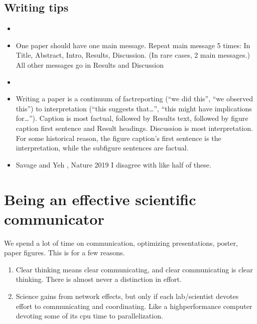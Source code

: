 \documentclass[letterpaper,10pt,english]{sphinxmanual}
\begin{document}
\subsection{Writing tips}
\label{\detokenize{PaperWritingTips:writing-tips}}\begin{itemize}
\item {} 
\sphinxAtStartPar
{}

\item {} 
\sphinxAtStartPar
One paper should have one main message. Repeat main message 5 times: In Title, Abstract, Intro, Results, Discussion. (In rare cases, 2 main messages.) All other messages go in Results and Discussion

\item {} 
\sphinxAtStartPar
{}

\item {} 
\sphinxAtStartPar
Writing a paper is a continuum of fact\sphinxhyphen{}reporting (“we did this”, “we observed this”) to interpretation (“this suggests that…”, “this might have implications for…”). Caption is most factual, followed by Results text, followed by figure caption first sentence and Result headings. Discussion is most interpretation. For some historical reason, the figure caption’s first sentence is the interpretation, while the subfigure sentences are factual.

\item {} 
\sphinxAtStartPar
Savage and Yeh , Nature 2019 I disagree with like half of these.

\end{itemize}


\section{Being an effective scientific communicator}
\label{\detokenize{02Elements:being-an-effective-scientific-communicator}}
\sphinxAtStartPar
We spend a lot of time on communication, optimizing presentations, poster, paper figures. This is for a few reasons.
\begin{enumerate}
%
\item {} 
\sphinxAtStartPar
Clear thinking means clear communicating, and clear communicating is clear thinking. There is almost never a distinction in effort.

\item {} 
\sphinxAtStartPar
Science gains from network effects, but only if each lab/scientist devotes effort to communicating and coordinating. Like a high\sphinxhyphen{}performance computer devoting some of its cpu time to parallelization.

\end{enumerate}
\end{document}
